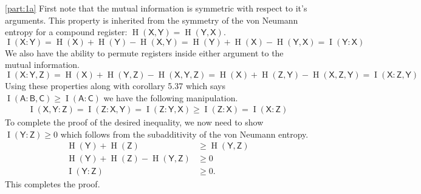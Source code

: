 \documentclass[boxes,pages,color=SeaGreen]{homework}
\newcommand{\reg}[1]{\mathsf{#1}}
\newcommand{\ent}{\operatorname{H}}
\newcommand{\mutIn}[2]{\operatorname{I}(#1 : #2)}
\begin{document}
\begin{solution}
    \ref{part:1a}
    First note that the mutual information is symmetric with respect to it's arguments.
    This property is inherited from the symmetry of the von Neumann entropy for a compound register: $\ent(\reg{X}, \reg{Y}) = \ent(\reg{Y}, \reg{X})$.
    \begin{equation*}
        \mutIn{\reg{X}}{\reg{Y}} = \ent(\reg{X}) + \ent(\reg{Y}) - \ent(\reg{X}, \reg{Y}) =  \ent(\reg{Y}) + \ent(\reg{X}) - \ent(\reg{Y}, \reg{X}) = \mutIn{\reg{Y}}{\reg{X}}
    \end{equation*}
    We also have the ability to permute registers inside either argument to the mutual information.
    \begin{equation*}
        \mutIn{\reg{X}}{\reg{Y}, \reg{Z}} = \ent(\reg{X}) + \ent(\reg{Y}, \reg{Z}) - \ent(\reg{X}, \reg{Y}, \reg{Z}) = \ent(\reg{X}) + \ent(\reg{Z}, \reg{Y}) - \ent(\reg{X}, \reg{Z}, \reg{Y}) = \mutIn{\reg{X}}{\reg{Z}, \reg{Y}}
    \end{equation*}
    Using these properties along with corollary 5.37 which says $\mutIn{\reg{A}}{\reg{B},\reg{C}} \geq \mutIn{\reg{A}}{\reg{C}}$ we have the following manipulation.
    \begin{align*}
        \mutIn{\reg{X}, \reg{Y}}{\reg{Z}} = \mutIn{\reg{Z}}{\reg{X}, \reg{Y}} = \mutIn{\reg{Z}}{\reg{Y}, \reg{X}} \geq \mutIn{\reg{Z}}{\reg{X}} = \mutIn{\reg{X}}{\reg{Z}}
    \end{align*}
    To complete the proof of the desired inequality, we now need to show $\mutIn{\reg{Y}}{\reg{Z}} \geq 0$ which follows from the subadditivity of the von Neumann entropy.
    \begin{align*}
        \ent(\reg{Y}) + \ent(\reg{Z})                          & \geq \ent(\reg{Y}, \reg{Z}) \\
        \ent(\reg{Y}) + \ent(\reg{Z}) - \ent(\reg{Y}, \reg{Z}) & \geq 0                      \\
        \mutIn{\reg{Y}}{\reg{Z}}                               & \geq 0.
    \end{align*}
    This completes the proof.


\end{solution}
\end{document}
